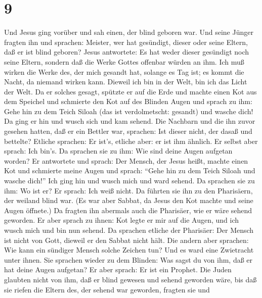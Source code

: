 \hypertarget{section-8}{%
\section{9}\label{section-8}}

 Und Jesus ging vorüber und sah einen, der blind geboren
war.  Und seine Jünger fragten ihn und sprachen: Meister,
wer hat gesündigt, dieser oder seine Eltern, daß er ist blind geboren?
 Jesus antwortete: Es hat weder dieser gesündigt noch seine
Eltern, sondern daß die Werke Gottes offenbar würden an ihm.
 Ich muß wirken die Werke des, der mich gesandt hat, solange
es Tag ist; es kommt die Nacht, da niemand wirken kann. 
Dieweil ich bin in der Welt, bin ich das Licht der Welt.  Da
er solches gesagt, spützte er auf die Erde und machte einen Kot aus dem
Speichel und schmierte den Kot auf des Blinden Augen  und
sprach zu ihm: Gehe hin zu dem Teich Siloah (das ist verdolmetscht:
gesandt) und wasche dich! Da ging er hin und wusch sich und kam sehend.
 Die Nachbarn und die ihn zuvor gesehen hatten, daß er ein
Bettler war, sprachen: Ist dieser nicht, der dasaß und bettelte?
 Etliche sprachen: Er ist's, etliche aber: er ist ihm
ähnlich. Er selbst aber sprach: Ich bin's.  Da sprachen sie
zu ihm: Wie sind deine Augen aufgetan worden?  Er
antwortete und sprach: Der Mensch, der Jesus heißt, machte einen Kot und
schmierte meine Augen und sprach: ``Gehe hin zu dem Teich Siloah und
wasche dich!'' Ich ging hin und wusch mich und ward sehend.
 Da sprachen sie zu ihm: Wo ist er? Er sprach: Ich weiß
nicht.  Da führten sie ihn zu den Pharisäern, der weiland
blind war.  (Es war aber Sabbat, da Jesus den Kot machte
und seine Augen öffnete.)  Da fragten ihn abermals auch die
Pharisäer, wie er wäre sehend geworden. Er aber sprach zu ihnen: Kot
legte er mir auf die Augen, und ich wusch mich und bin nun sehend.
 Da sprachen etliche der Pharisäer: Der Mensch ist nicht
von Gott, dieweil er den Sabbat nicht hält. Die andern aber sprachen:
Wie kann ein sündiger Mensch solche Zeichen tun? Und es ward eine
Zwietracht unter ihnen.  Sie sprachen wieder zu dem
Blinden: Was sagst du von ihm, daß er hat deine Augen aufgetan? Er aber
sprach: Er ist ein Prophet.  Die Juden glaubten nicht von
ihm, daß er blind gewesen und sehend geworden wäre, bis daß sie riefen
die Eltern des, der sehend war geworden,  fragten sie und
